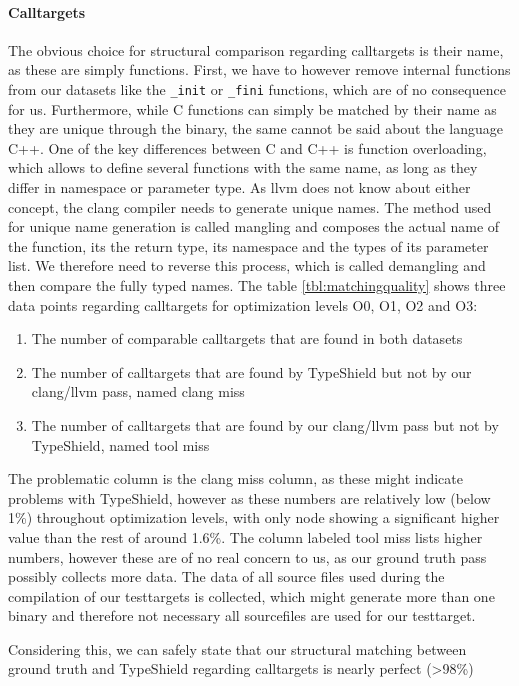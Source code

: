 \paragraph {Calltargets} The obvious choice for structural comparison regarding calltargets is their name, as these are simply functions. First, we have to however remove internal functions from our datasets like the \texttt{\_init} or \texttt{\_fini} functions, which are of no consequence for us. Furthermore, while C functions can simply be matched by their name as they are unique through the binary, the same cannot be said about the language C++. One of the key differences between C and C++ is function overloading, which allows to define several functions with the same name, as long as they differ in namespace or parameter type. As llvm does not know about either concept, the clang compiler needs to generate unique names. The method used for unique name generation is called mangling and composes the actual name of the function, its the return type, its namespace and the types of its parameter list. We therefore need to reverse this process, which is called demangling and then compare the fully typed names.
The table \ref{tbl:matchingquality} shows three data points regarding calltargets for optimization levels O0, O1, O2 and O3:
\begin{enumerate}
\item The number of comparable calltargets that are found in both datasets
\item The number of calltargets that are found by TypeShield but not by our clang/llvm pass, named clang miss
\item The number of calltargets that are found by our clang/llvm pass but not by TypeShield, named tool miss
\end{enumerate}
The problematic column is the clang miss column, as these might indicate problems with TypeShield, however as these numbers are relatively low (below 1\%) throughout optimization levels, with only node showing a significant higher value than the rest of around 1.6\%. The column labeled tool miss lists higher numbers, however these are of no real concern to us, as our ground truth pass possibly collects more data. The data of all source files used during the compilation of our testtargets is collected, which might generate more than one binary and therefore not necessary all sourcefiles are used for our testtarget.

Considering this, we can safely state that our structural matching between ground truth and TypeShield regarding calltargets is nearly perfect (\textgreater 98\%)


